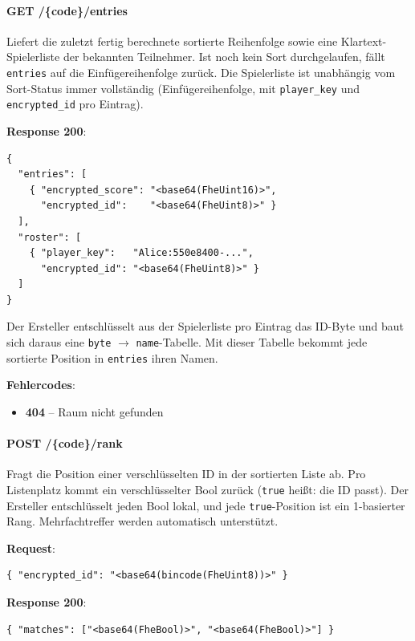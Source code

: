 \paragraph{GET /\{code\}/entries}

Liefert die zuletzt fertig berechnete sortierte Reihenfolge sowie eine Klartext-Spielerliste der bekannten Teilnehmer. Ist noch kein Sort durchgelaufen, fällt \texttt{entries} auf die Einfügereihenfolge zurück. Die Spielerliste ist unabhängig vom Sort-Status immer vollständig (Einfügereihenfolge, mit \texttt{player\_key} und \texttt{encrypted\_id} pro Eintrag).

\textbf{Response 200}:
\begin{lstlisting}
{
  "entries": [
    { "encrypted_score": "<base64(FheUint16)>",
      "encrypted_id":    "<base64(FheUint8)>" }
  ],
  "roster": [
    { "player_key":   "Alice:550e8400-...",
      "encrypted_id": "<base64(FheUint8)>" }
  ]
}
\end{lstlisting}

Der Ersteller entschlüsselt aus der Spielerliste pro Eintrag das ID-Byte und baut sich daraus eine \texttt{byte} $\rightarrow$ \texttt{name}-Tabelle. Mit dieser Tabelle bekommt jede sortierte Position in \texttt{entries} ihren Namen.

\textbf{Fehlercodes}:
\begin{itemize}
    \item \textbf{404} -- Raum nicht gefunden
\end{itemize}

\paragraph{POST /\{code\}/rank}

Fragt die Position einer verschlüsselten ID in der sortierten Liste ab. Pro Listenplatz kommt ein verschlüsselter Bool zurück (\texttt{true} heißt: die ID passt). Der Ersteller entschlüsselt jeden Bool lokal, und jede \texttt{true}-Position ist ein 1-basierter Rang. Mehrfachtreffer werden automatisch unterstützt.

\textbf{Request}:
\begin{lstlisting}
{ "encrypted_id": "<base64(bincode(FheUint8))>" }
\end{lstlisting}

\textbf{Response 200}:
\begin{lstlisting}
{ "matches": ["<base64(FheBool)>", "<base64(FheBool)>"] }
\end{lstlisting}

